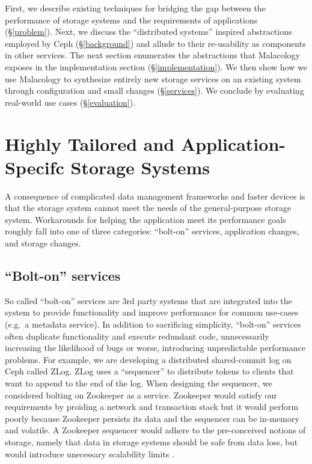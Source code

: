 \documentclass[10pt,twocolumn]{article}
\begin{document}
First, we describe existing techniques for bridging the gap between the
performance of storage systems and the requirements of applications
(\S\ref{problem}). Next, we discuss the ``distributed systems'' inspired
abstractions employed by Ceph (\S\ref{background}) and allude to their
re-usability as components in other services. The next section
enumerates the abstractions that Malacology exposes in the
implementation section (\S\ref{implementation}). We then show how we use
Malacology to synthesize entirely new storage services on an existing
system through configuration and small changes (\S\ref{services}). We
conclude by evaluating real-world use cases (\S\ref{evaluation}).

\section{Highly Tailored and Application-Specifc Storage
Systems}\label{highly-tailored-and-application-specifc-storage-systems}

\label{problem}

A consequence of complicated data management frameworks and faster
devices is that the storage system cannot meet the needs of the
general-purpose storage system. Workarounds for helping the application
meet its performance goals roughly fall into one of three categories:
``bolt-on'' services, application changes, and storage changes.

\subsection{\texorpdfstring{``Bolt-on''
services}{Bolt-on services}}\label{bolt-on-services}

So called ``bolt-on'' services are 3rd party systems that are integrated
into the system to provide functionality and improve performance for
common use-cases (e.g.~a metadata service). In addition to sacrificing
simplicity, ``bolt-on'' services often duplicate functionality and
execute redundant code, unnecessarily increasing the likelihood of bugs
or worse, introducing unpredictable performance problems. For example,
we are developing a distributed shared-commit log on Ceph called ZLog.
ZLog uses a ``sequencer'' to distribute tokens to clients that want to
append to the end of the log. When designing the sequencer, we
considered bolting on Zookeeper \autocite{} as a service. Zookeeper would
satisfy our requirements by proiding a network and transaction stack but
it would perform poorly because Zookeeper persists its data and the
sequencer can be in-memory and volatile. A Zookeeper sequencer would
adhere to the pre-conceived notions of storage, namely that data in
storage systems should be safe from data loss, but would introduce
unecessary scalability limits \autocite{Neha HDFS namenode example}.
\end{document}
